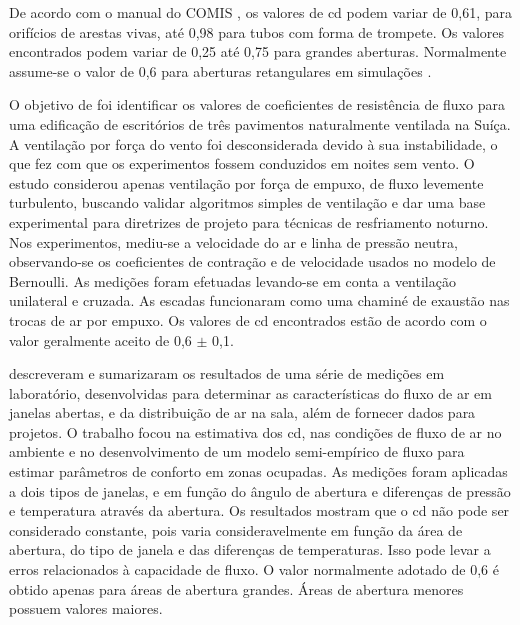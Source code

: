De acordo com o manual do COMIS \cite{Feustel1990}, os valores de \acrshort{cd} podem variar de 0,61, para orifícios de arestas vivas,	até 0,98 para tubos com forma de trompete. Os valores encontrados podem variar de 0,25 até 0,75 para grandes aberturas. Normalmente assume-se o valor de 0,6 para aberturas retangulares em simulações  \cite{Flourentzou1998, Heiselberg2001, Breesch2010, Iqbal2015, Krzaczek2015, Arendt2017}.

O objetivo de  foi identificar os valores de coeficientes de resistência de fluxo para uma edificação de escritórios de três pavimentos naturalmente ventilada na Suíça. A ventilação por força do vento foi desconsiderada devido à sua instabilidade, o que fez com que os experimentos fossem conduzidos em noites sem vento. O estudo considerou apenas ventilação por força de empuxo, de fluxo levemente turbulento, buscando validar algoritmos simples de ventilação e dar uma base experimental para diretrizes de projeto para técnicas de resfriamento noturno. Nos experimentos, mediu-se a velocidade do ar e linha de pressão neutra, observando-se os coeficientes de contração e de velocidade usados no modelo de Bernoulli. As medições foram efetuadas levando-se em conta a ventilação unilateral e cruzada. As escadas funcionaram como uma chaminé de exaustão nas trocas de ar por empuxo. Os valores de \acrshort{cd} encontrados estão de acordo com o valor geralmente aceito de 0,6 ${\pm}$ 0,1.

 descreveram e sumarizaram os resultados de uma série de medições em laboratório, desenvolvidas para determinar as características do fluxo de ar em janelas abertas, e da distribuição de ar na sala, além de fornecer dados para projetos. O trabalho focou na estimativa dos \acrshort{cd}, nas condições de fluxo de ar no ambiente e no desenvolvimento de um modelo semi-empírico de fluxo para estimar parâmetros de conforto em zonas ocupadas. As medições foram aplicadas a dois tipos de janelas, e em função do ângulo de abertura e diferenças de pressão e temperatura através da abertura. Os resultados mostram que o \acrshort{cd} não pode ser considerado constante, pois varia consideravelmente em função da área de abertura, do tipo de janela e das diferenças de temperaturas. Isso pode levar a erros relacionados à capacidade de fluxo. O valor normalmente adotado de 0,6 é obtido apenas para áreas de abertura grandes. Áreas de abertura menores possuem valores maiores.

